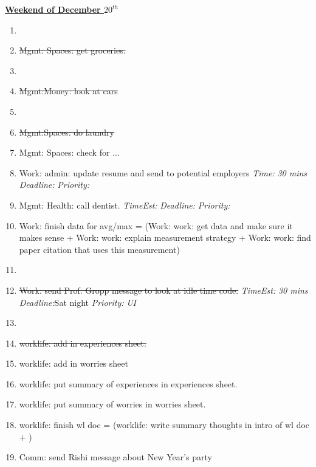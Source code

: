 \documentclass[11pt]{article}
\newcommand{\doneTask}[1]{\item \sout{#1}}
\newcommand{\timeEst}[1]{\textit{Time:} \textit{#1}}
\newcommand{\te}[1]{\textit{TimeEst:} \textit{#1}}
\newcommand{\pr}[1]{\textit{Priority:} \textit{#1}}
\newcommand{\dl}[1]{\textit{Deadline:}#1}
\begin{document}
      {\small \underline{\textbf{Weekend of December $20^{th}$}} }
      \begin{enumerate} 
      \item \tiny \doneTask{Mgmt: Spaces: get groceries.}
      \item \tiny \doneTask{Mgmt:Money: look at cars}
      \item \tiny \doneTask{Mgmt:Spaces: do laundry}
      \item \tiny Mgmt: Spaces: check for ... 
      \item \tiny Work: admin: update resume and send to potential employers \timeEst{30 mins} \dl{} \pr{}  
        \tiny \item \tiny Mgmt: Health: call dentist. \te{}  \dl{}  \pr{} 
      \item \tiny Work: finish data for avg/max =  (Work: work: get data and make sure it makes sense + Work: work: explain
        measurement strategy + Work: work: find paper citation that
        uses this measurement)  
      \item  \doneTask{ Work: send Prof. Gropp message to look at idle time
        code.} \te{30 mins} \dl{Sat night} \pr{UI} 
      \item \tiny \doneTask{worklife: add  in experiences sheet. } 
      \item \tiny worklife: add in worries sheet 
      \item \tiny worklife: put summary of experiences in experiences sheet. 
      \item \tiny worklife: put summary of worries in worries sheet.
      \item \tiny worklife: finish wl doc  = (worklife: write summary thoughts  in intro of wl doc +   ) 
      \item \tiny Comm: send Rishi message about New Year's party
        
      \end{enumerate}
      
\end{document}
